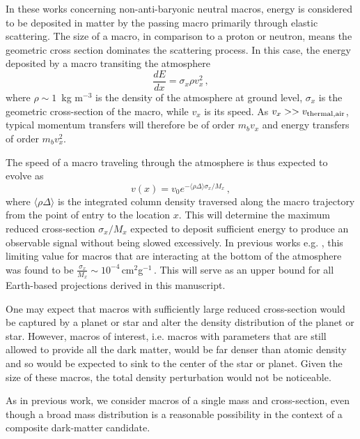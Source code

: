 \documentclass[%
 reprint,
 amsmath,amssymb,
 aps,
]{revtex4-2}
\begin{document}
    In these works concerning non-anti-baryonic neutral macros, energy is considered to be deposited in matter by the passing macro primarily through elastic scattering. The size of a macro, in comparison to a proton or neutron, means the geometric cross section dominates the scattering process. In this case, the energy deposited by a macro transiting the atmosphere 
    \begin{equation}\label{eq:dedx}
        \frac{dE}{dx} = \sigma_x \rho v_x^2\,,
    \end{equation}
    where $\rho \sim 1\,$ kg m$^{-3}$ is the density of the atmosphere at ground level, $\sigma_x$ is the geometric cross-section of the macro,  while $v_x$ is its speed. As $v_{x} >> v_{\rm{thermal, air}}$, typical momentum transfers will therefore be of order $m_b v_{x}$ and energy transfers of order $m_b v_{x}^2$.

    The speed of a macro traveling through the atmosphere is thus expected to evolve as
    \begin{equation}\label{eq:atmo_velocity}
        v(x) = v_{0} e^{-\langle \rho \Delta\rangle \sigma_x/{M_x}}\,,
    \end{equation}
    where $\langle \rho \Delta\rangle$ is the integrated column density traversed along the macro trajectory from the point of entry to the location $x$. This will determine the maximum reduced cross-section $\sigma_x/M_x$ expected to deposit sufficient energy to produce an observable signal without being slowed excessively. In previous works e.g. \cite{Sidhu2019death, Sidhu2019bolide}, this limiting value for macros that are interacting at the bottom of the atmosphere was found to be $\frac{\sigma_x}{M_x} \sim 10^{-4}\,$cm$^2$g$^{-1}\,$. This will serve as an upper bound for all Earth-based projections derived in this manuscript.
    
    One may expect that macros with sufficiently large reduced cross-section would be captured by a planet or star and alter the density distribution of the planet or star. However, macros of interest, i.e. macros with parameters that are still allowed to provide all the dark matter, would be far denser than atomic density and so would be expected to sink to the center of the star or planet. Given the size of these macros, the total density
    perturbation would not be noticeable.

    As in previous work, we consider macros of a single mass and cross-section, even though a broad mass distribution is a reasonable possibility in the context of a composite dark-matter candidate.
\end{document}
